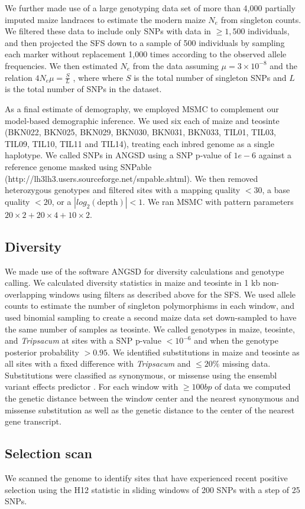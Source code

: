 \documentclass[twoside, twocolumn, letterpaper]{article}
\begin{document}
We further made use of a large genotyping data set of more than 4,000 partially imputed maize landraces \cite{Hearne2015} to estimate the modern maize $N_e$ from singleton counts. 
We filtered these data to include only SNPs with data in $\geq 1,500$ individuals, and then projected the SFS down to a sample of 500 individuals by sampling each marker without replacement 1,000 times according to the observed allele frequencies.
We then estimated $N_e$ from the data assuming $\mu = 3 \times 10^{-8}$ \cite{clark2005} and the relation  $4N_e\mu = \frac{S}{L}$ \cite{fu1993}, where where $S$ is the total number of singleton SNPs and $L$ is the total number of SNPs in the dataset.

As a final estimate of demography, we employed MSMC \cite{schiffels2014}  to complement our model-based demographic inference. 
We used six each of maize and teosinte (BKN022, BKN025, BKN029, BKN030, BKN031, BKN033, TIL01, TIL03, TIL09, TIL10, TIL11 and TIL14), treating each inbred genome as a single haplotype.
We called SNPs in ANGSD \cite{korneliussen2014} using a SNP p-value of $1e-6$ against a reference genome masked using SNPable (http://lh3lh3.users.sourceforge.net/snpable.shtml). 
We then removed heterozygous genotypes and filtered sites with a mapping quality $<30$, a base quality $<20$, or a $|\textit{log}_2(\text{depth})|<1$.
We ran MSMC with pattern parameters $20\times2+20\times4+10\times2$.

\subsection*{Diversity}
We made use of the software ANGSD \cite{korneliussen2014} for diversity calculations and genotype calling. 
We calculated diversity statistics in maize and teosinte in 1 kb non-overlapping windows using filters as described above for the SFS. 
We used allele counts to estimate the number of singleton polymorphisms in each window, and used binomial sampling to create a second maize data set down-sampled to have the same number of samples as teosinte.
We called genotypes in maize, teosinte, and \textit{ Tripsacum} at sites with a SNP p-value $<10^{-6}$ and when the genotype posterior probability $>0.95$. 
We identified substitutions in maize and teosinte as all sites with a fixed difference with \textit{Tripsacum} and $\leq 20\%$ missing data. 
Substitutions were classified as synonymous, or missense using the ensembl variant effects predictor \cite{mclaren2010}.
For each window with $\geq 100bp$ of data we computed the genetic distance between the window center and the nearest synonymous and missense substitution as well as the genetic distance to the center of the nearest gene transcript.  

\subsection*{Selection scan}
We scanned the genome to identify sites that have experienced recent positive selection using the H12 statistic \cite{garud2015} in sliding windows of 200 SNPs with a step of 25 SNPs.


\onecolumn
 
\end{document}
